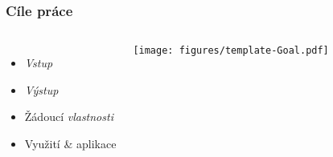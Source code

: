   
  
  
  
  \begin{frame}
    \frametitle{Cíle práce}
    \begin{columns}
      \begin{itemize}
          \item \emph{Vstup}
          \item \emph{Výstup}
          \item Žádoucí \emph{vlastnosti}
          \item Využití \& aplikace
      \end{itemize}
       
          \texttt{[image: figures/template-Goal.pdf]}
    \end{columns}
  \end{frame}
  
  
  
  
